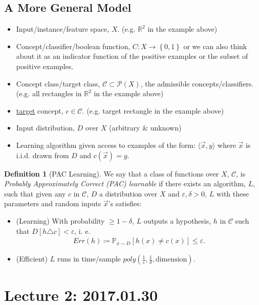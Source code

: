 \documentclass[12pt, letterpaper]{article}
\numberwithin{equation}{section} %
\newcommand{\R}{\mathbb{R}}
\newcommand{\ul}{\underline}
\newcommand{\mb}{\mathbb}
\newcommand{\mc}{\mathcal}
\newcommand{\ve}{\varepsilon}
\theoremstyle{definition}
\newtheorem{definition}[theorem]{Definition}
\theoremstyle{remark}
\begin{document}
\subsection{A More General Model}

\begin{itemize}
	\item Input/instance/feature space, $X$. (e.g. $\R^2$ in the example above)
	\item Concept/classifier/boolean function, $C: X \rightarrow \left\{0,1\right\}$ or we can also think about it as an indicator function of the positive examples or the subset of positive examples.
	\item Concept class/target class, $\mc C \subset \mc P(X)$, the admissible concepts/classifiers. (e.g. all rectangles in $\R^2$ in the example above)
	\item \ul{target} concept, $c\in\mc C$. (e.g. target rectangle in the example above)
	\item Input distribution, $D$ over $X$ (arbitrary \& unknown)
	\item Learning algorithm given access to examples of the form: $\langle \vec x,y \rangle$ where $\vec x$ is i.i.d. drawn from $D$ and $c(\vec x) = y$.
\end{itemize}

\begin{definition}[PAC Learning]
	We say that a class of functions over $X$, $\mc C$, is \emph{Probably Approximately Correct (PAC) learnable} if there exists an algorithm, $L$, such that given any $c$ in $\mc C$, $D$ a distribution over $X$ and $\ve, \delta >0$, $L$ with these parameters and random inputs $\vec x$'s satisfies:  
	\begin{itemize}
		\item (Learning) With probability $\geq 1 -\delta$, $L$ outputs a hypothesis, $h$ in $\mc 
		C$ such that $D[h\triangle c]<\ve$, i. e.
		\begin{align}
    		Err(h) \coloneqq \mb P_{x\sim D}[h(x) \ne c(x)] \leq \ve.
		\end{align}
		\item (Efficient) $L$ runs in time/sample $poly\left(\frac1\ve, \frac1\delta, \textrm{dimension}\right)$.
	\end{itemize}
\end{definition}


\section{Lecture 2: 2017.01.30}
\end{document}
